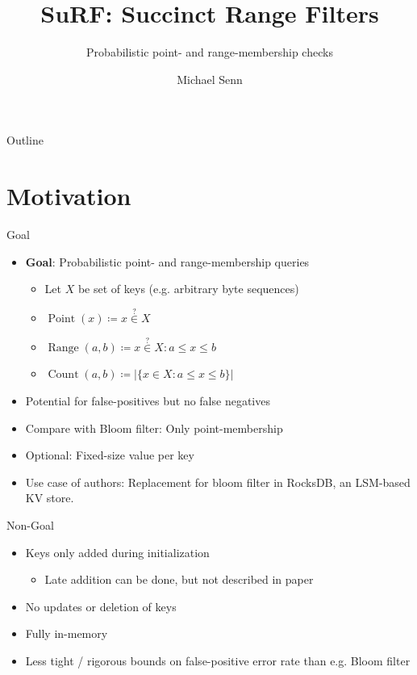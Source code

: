 \documentclass{beamer}
\title{SuRF: Succinct Range Filters}
\subtitle{Probabilistic point- and range-membership checks}
\author{Michael Senn}
\institute{Faculty of Science, University of Bern}
\date{\DTMusedate{presentation}}
\begin{document}
\maketitle

\begin{frame}{Outline}
		\tableofcontents
\end{frame}


\section{Motivation}

\begin{frame}{Goal}
		\begin{itemize}
				\item \textbf{Goal}: Probabilistic point- and range-membership queries
						\begin{itemize}
								\item Let $X$ be set of keys (e.g. arbitrary byte sequences)
								\item $\operatorname{Point}(x) \coloneqq x \overset{?}{\in} X$
								\item $\operatorname{Range}(a, b) \coloneqq x \overset{?}{\in} X : a \leq x \leq b$
								\item $\operatorname{Count}(a, b) \coloneqq |\{x \in X : a \leq x \leq b\}|$
						\end{itemize}
				\item Potential for false-positives but no false negatives
				\item Compare with Bloom filter: Only point-membership
				\item Optional: Fixed-size value per key
				\item Use case of authors: Replacement for bloom filter in
						RocksDB, an LSM-based KV store.
		\end{itemize}
\end{frame}

\begin{frame}{Non-Goal}
		\begin{itemize}
				\item Keys only added during initialization
						\begin{itemize}
								\item Late addition can be done, but not
										described in paper
						\end{itemize}
				\item No updates or deletion of keys
				\item Fully in-memory
				\item Less tight / rigorous bounds on false-positive error rate
						than e.g. Bloom filter
		\end{itemize}
\end{frame}
\end{document}
